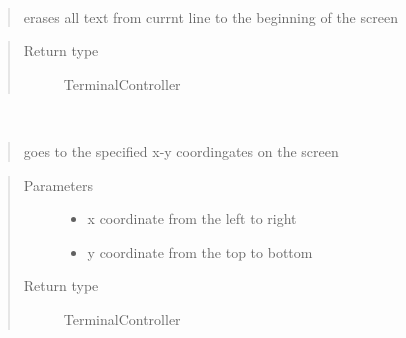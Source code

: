 \documentclass[a4paper,10pt,english]{sphinxmanual}
\begin{document}
\begin{fulllineitems}
\begin{fulllineitems}
\begin{quote}
\begin{description}
\end{description}\end{quote}

\end{fulllineitems}


\begin{fulllineitems}
\label{\detokenize{api/termtools.terminal.TerminalController:termtools.terminal.TerminalController.eraseUp}}~\begin{quote}

erases all text from currnt line to the beginning of the screen
\end{quote}
\begin{quote}\begin{description}
\item[{Return type}] \leavevmode
TerminalController

\end{description}\end{quote}

\end{fulllineitems}


\begin{fulllineitems}
\label{\detokenize{api/termtools.terminal.TerminalController:termtools.terminal.TerminalController.goto}}~\begin{quote}

goes to the specified x-y coordingates on the screen
\end{quote}
\begin{quote}\begin{description}
\item[{Parameters}] \leavevmode\begin{itemize}
\item {} 
 \textendash{} x coordinate from the left to right

\item {} 
 \textendash{} y coordinate from the top to bottom

\end{itemize}

\item[{Return type}] \leavevmode
TerminalController


\end{description}
\end{quote}
\end{fulllineitems}
\end{fulllineitems}
\end{document}
